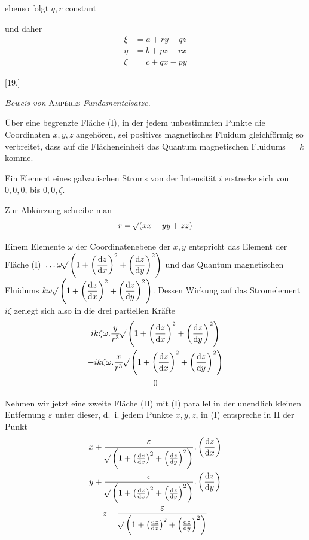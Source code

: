 ebenso folgt $q,r$ constant

und daher
\[
\begin{aligned}
\xi&=a+ry-qz\\
\eta&=b+pz-rx\\
\zeta&=c+qx-py
\end{aligned}
\]

\begin{center}[19.]\par\medskip\textit{Beweis von} \textsc{Ampères} \textit{Fundamentalsatze.}\end{center}
Über eine begrenzte Fläche (I), in der jedem unbestimmten Punkte die Coordinaten $x,y,z$ angehören, sei positives magnetisches Fluidum gleichförmig so verbreitet, dass auf die Flächeneinheit das Quantum magnetischen Fluidums $=k$ komme.

Ein Element eines galvanischen Stroms von der Intensität $i$ erstrecke sich von $0,0,0$, bis $0,0,\zeta$.

Zur Abkürzung schreibe man
\[
r=\mathord{{}^{}\!\surd}(xx+yy+zz)
\]

Einem Elemente $\omega$ der Coordinatenebene der $x,y$ entspricht das Element der Fläche (I) $\, .\, .\, .\,\omega\mathord{{}^{}\!\surd}\left(1+\left(\dfrac{\mathrm dz}{\mathrm dx}\right)^2+\left(\dfrac{\mathrm dz}{\mathrm dy}\right)^2\right)$ und das Quantum magnetischen Fluidums $k\omega\mathord{{}^{}\!\surd}\left(1+\left(\dfrac{\mathrm dz}{\mathrm dx}\right)^2+\left(\dfrac{\mathrm dz}{\mathrm dy}\right)^2\right)$. Dessen Wirkung auf das Stromelement $i\zeta$ zerlegt sich also in die drei partiellen Kräfte
\[
\begin{gathered}
ik\zeta\omega.\frac{y}{r^3}\mathord{{}^{}\!\surd}\left(1+\left(\frac{\mathrm dz}{\mathrm dx}\right)^2+\left(\frac{\mathrm dz}{\mathrm dy}\right)^2\right)\\
-ik\zeta\omega.\frac{x}{r^3}\mathord{{}^{}\!\surd}\left(1+\left(\frac{\mathrm dz}{\mathrm dx}\right)^2+\left(\frac{\mathrm dz}{\mathrm dy}\right)^2\right)\\
0
\end{gathered}
\]

Nehmen wir jetzt eine zweite Fläche (II) mit (I) parallel in der unendlich kleinen Entfernung $\varepsilon$ unter dieser, d.\ i. jedem Punkte $x,y,z$, in (I) entspreche in II der Punkt
\[
\begin{gathered}
x+\frac{\varepsilon}{\mathord{{}^{}\!\surd}\left(1+\left(\frac{\mathrm dz}{\mathrm dx}\right)^2+\left(\frac{\mathrm dz}{\mathrm dy}\right)^2\right)}.\left(\frac{\mathrm dz}{\mathrm dx}\right)\\
y+\frac{\varepsilon}{\mathord{{}^{}\!\surd}\left(1+\left(\frac{\mathrm dz}{\mathrm dx}\right)^2+\left(\frac{\mathrm dz}{\mathrm dy}\right)^2\right)}.\left(\frac{\mathrm dz}{\mathrm dy}\right)\\
z-\frac{\varepsilon}{\mathord{{}^{}\!\surd}\left(1+\left(\frac{\mathrm dz}{\mathrm dx}\right)^2+\left(\frac{\mathrm dz}{\mathrm dy}\right)^2\right)}
\end{gathered}
\]

